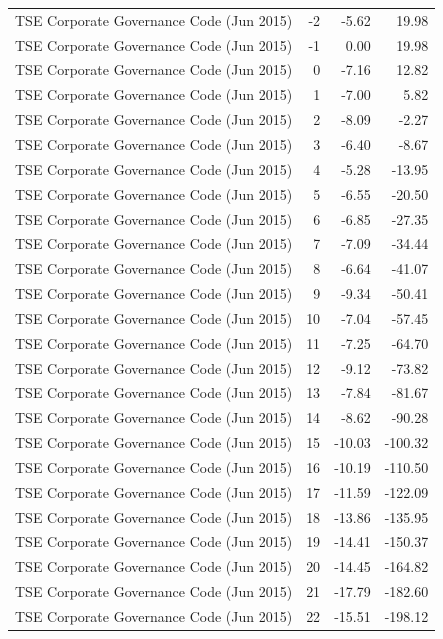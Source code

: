 \begin{table}
\begin{tabular}{lrrr}
TSE Corporate Governance Code (Jun 2015) & -2 & -5.62 & 19.98 \\
TSE Corporate Governance Code (Jun 2015) & -1 & 0.00 & 19.98 \\
TSE Corporate Governance Code (Jun 2015) & 0 & -7.16 & 12.82 \\
TSE Corporate Governance Code (Jun 2015) & 1 & -7.00 & 5.82 \\
TSE Corporate Governance Code (Jun 2015) & 2 & -8.09 & -2.27 \\
TSE Corporate Governance Code (Jun 2015) & 3 & -6.40 & -8.67 \\
TSE Corporate Governance Code (Jun 2015) & 4 & -5.28 & -13.95 \\
TSE Corporate Governance Code (Jun 2015) & 5 & -6.55 & -20.50 \\
TSE Corporate Governance Code (Jun 2015) & 6 & -6.85 & -27.35 \\
TSE Corporate Governance Code (Jun 2015) & 7 & -7.09 & -34.44 \\
TSE Corporate Governance Code (Jun 2015) & 8 & -6.64 & -41.07 \\
TSE Corporate Governance Code (Jun 2015) & 9 & -9.34 & -50.41 \\
TSE Corporate Governance Code (Jun 2015) & 10 & -7.04 & -57.45 \\
TSE Corporate Governance Code (Jun 2015) & 11 & -7.25 & -64.70 \\
TSE Corporate Governance Code (Jun 2015) & 12 & -9.12 & -73.82 \\
TSE Corporate Governance Code (Jun 2015) & 13 & -7.84 & -81.67 \\
TSE Corporate Governance Code (Jun 2015) & 14 & -8.62 & -90.28 \\
TSE Corporate Governance Code (Jun 2015) & 15 & -10.03 & -100.32 \\
TSE Corporate Governance Code (Jun 2015) & 16 & -10.19 & -110.50 \\
TSE Corporate Governance Code (Jun 2015) & 17 & -11.59 & -122.09 \\
TSE Corporate Governance Code (Jun 2015) & 18 & -13.86 & -135.95 \\
TSE Corporate Governance Code (Jun 2015) & 19 & -14.41 & -150.37 \\
TSE Corporate Governance Code (Jun 2015) & 20 & -14.45 & -164.82 \\
TSE Corporate Governance Code (Jun 2015) & 21 & -17.79 & -182.60 \\
TSE Corporate Governance Code (Jun 2015) & 22 & -15.51 & -198.12 \\

\end{tabular}
\end{table}
